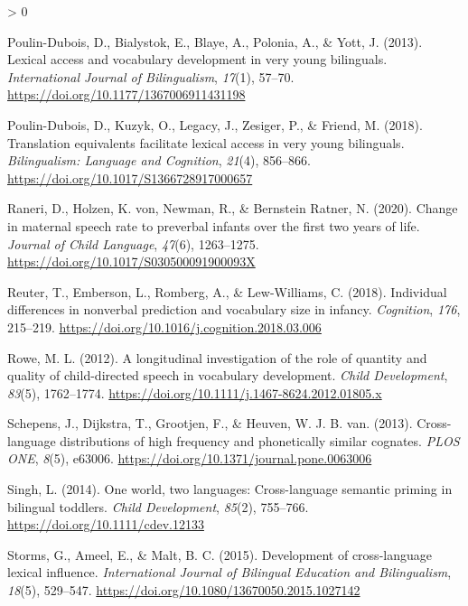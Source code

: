 \documentclass[
  english,
  ,man,floatsintext]{apa6}
\newlength{\cslhangindent}
\newenvironment{CSLReferences}[2] %
 {%
  \setlength{\parindent}{0pt}
  \ifodd #1 \everypar{\setlength{\hangindent}{\cslhangindent}}\ignorespaces\fi
  \ifnum #2 > 0
  \setlength{\parskip}{#2\baselineskip}
  \fi
 }%
 {}
\begin{document}
\begin{CSLReferences}{1}{0}
\leavevmode\hypertarget{ref-Poulin-Dubois_etal_2013}{}%
Poulin-Dubois, D., Bialystok, E., Blaye, A., Polonia, A., \& Yott, J. (2013). Lexical access and vocabulary development in very young bilinguals. \emph{International Journal of Bilingualism}, \emph{17}(1), 57--70. \url{https://doi.org/10.1177/1367006911431198}

\leavevmode\hypertarget{ref-Poulin-Dubois_etal_2018}{}%
Poulin-Dubois, D., Kuzyk, O., Legacy, J., Zesiger, P., \& Friend, M. (2018). Translation equivalents facilitate lexical access in very young bilinguals. \emph{Bilingualism: Language and Cognition}, \emph{21}(4), 856--866. \url{https://doi.org/10.1017/S1366728917000657}

\leavevmode\hypertarget{ref-Raneri_etal_2020}{}%
Raneri, D., Holzen, K. von, Newman, R., \& Bernstein Ratner, N. (2020). Change in maternal speech rate to preverbal infants over the first two years of life. \emph{Journal of Child Language}, \emph{47}(6), 1263--1275. \url{https://doi.org/10.1017/S030500091900093X}

\leavevmode\hypertarget{ref-Reuter_etal_2018}{}%
Reuter, T., Emberson, L., Romberg, A., \& Lew-Williams, C. (2018). Individual differences in nonverbal prediction and vocabulary size in infancy. \emph{Cognition}, \emph{176}, 215--219. \url{https://doi.org/10.1016/j.cognition.2018.03.006}

\leavevmode\hypertarget{ref-Rowe_2012}{}%
Rowe, M. L. (2012). A longitudinal investigation of the role of quantity and quality of child-directed speech in vocabulary development. \emph{Child Development}, \emph{83}(5), 1762--1774. \url{https://doi.org/10.1111/j.1467-8624.2012.01805.x}

\leavevmode\hypertarget{ref-Schepens_etal_2013}{}%
Schepens, J., Dijkstra, T., Grootjen, F., \& Heuven, W. J. B. van. (2013). Cross-language distributions of high frequency and phonetically similar cognates. \emph{PLOS ONE}, \emph{8}(5), e63006. \url{https://doi.org/10.1371/journal.pone.0063006}

\leavevmode\hypertarget{ref-Singh_2014}{}%
Singh, L. (2014). One world, two languages: Cross-language semantic priming in bilingual toddlers. \emph{Child Development}, \emph{85}(2), 755--766. \url{https://doi.org/10.1111/cdev.12133}

\leavevmode\hypertarget{ref-Storms_etal_2015}{}%
Storms, G., Ameel, E., \& Malt, B. C. (2015). Development of cross-language lexical influence. \emph{International Journal of Bilingual Education and Bilingualism}, \emph{18}(5), 529--547. \url{https://doi.org/10.1080/13670050.2015.1027142}


\end{CSLReferences}
\end{document}
